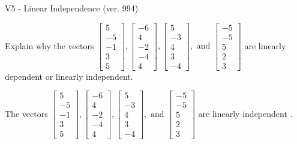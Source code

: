 \begin{exercise}
  \begin{exerciseTitle}V5 - Linear Independence (ver. 994)\end{exerciseTitle}
  \begin{exerciseStatement}
    Explain why the vectors \(\left[\begin{array}{r}
5 \\
-5 \\
-1 \\
3 \\
5
\end{array}\right] , \left[\begin{array}{r}
-6 \\
4 \\
-2 \\
-4 \\
4
\end{array}\right] , \left[\begin{array}{r}
5 \\
-3 \\
4 \\
3 \\
-4
\end{array}\right] , \text{ and } \left[\begin{array}{r}
-5 \\
-5 \\
5 \\
2 \\
3
\end{array}\right]\) are linearly dependent or linearly independent.	


  \end{exerciseStatement}
  \begin{exerciseAnswer}
   The vectors \(\left[\begin{array}{r}
5 \\
-5 \\
-1 \\
3 \\
5
\end{array}\right] , \left[\begin{array}{r}
-6 \\
4 \\
-2 \\
-4 \\
4
\end{array}\right] , \left[\begin{array}{r}
5 \\
-3 \\
4 \\
3 \\
-4
\end{array}\right] , \text{ and } \left[\begin{array}{r}
-5 \\
-5 \\
5 \\
2 \\
3
\end{array}\right]\) are 
  	 linearly independent  .
  


  \end{exerciseAnswer}
\end{exercise}